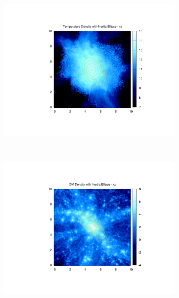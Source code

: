 \documentclass[journal]{IEEEtran}
\begin{document}
\begin{figure}[!t]
\begin{subfigure}[t]{0.3\textwidth}
		\includegraphics[width=\linewidth]{TempDenEllipxy}
	\end{subfigure}
	\\
	\begin{subfigure}[t]{0.3\textwidth}
		\centering
		\includegraphics[width=\linewidth]{DMDenEllipxz}
	\end{subfigure}
	\quad
	\begin{subfigure}[t]{0.3\textwidth}
		\centering

\end{subfigure}
\end{figure}
\end{document}
